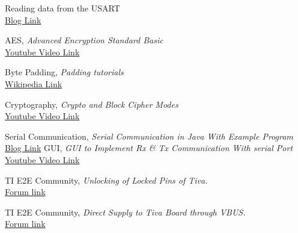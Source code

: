 \documentclass[a4paper,12pt,oneside]{book}
\begin{document}
\begin{thebibliography}{li}



Reading data from the USART\\
\href{http://extremeelectronics.co.in/avr-tutorials/using-the-usart-of-avr-microcontrollers-reading-and-writing-data/}{Blog Link}

AES,  {\em Advanced Encryption Standard Basic}\\
\href{https://www.youtube.com/watch?v=liKXtikP9F0}{Youtube Video Link}

Byte Padding, {\em Padding tutorials}\\
\href{https://en.wikipedia.org/wiki/Padding\_(cryptography)#Byte\_padding}{Wikipedia Link}

Cryptography, {\em Crypto and Block Cipher Modes } \\
\href{https://www.youtube.com/watch?v=t0pREiDO7_g}{Youtube Video Link}

Serial Communication, {\em Serial Communication in Java With Example Program}\\
\href{https://blog.henrypoon.com/blog/2011/01/01/serial-communication-in-java-with-example-program/}{Blog Link}
GUI, {\em GUI to Implement Rx \& Tx Communication With serial Port}\\
\href{https://www.youtube.com/watch?v=hteeNdA7pOo}{Youtube Video Link}

TI E2E Community, {\em Unlocking of Locked Pins of Tiva.} \\
\href{https://e2e.ti.com/support/microcontrollers/tiva_arm/f/908/t/284566}{Forum link}

TI E2E Community, {\em Direct Supply to Tiva Board through VBUS.} \\
\href{https://e2e.ti.com/support/microcontrollers/tiva_arm/f/908/t/346725}{Forum link}

\end{thebibliography}
\end{document}
